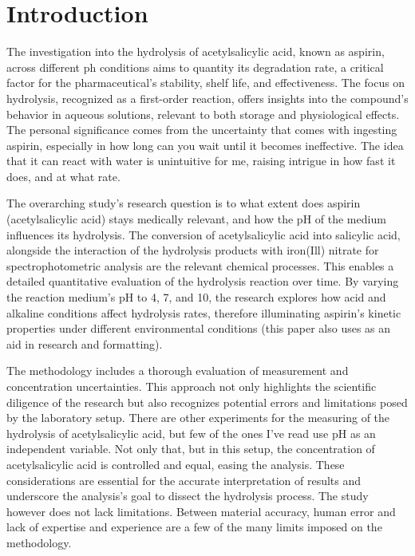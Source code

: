\documentclass{article}
\begin{document}
\pagestyle{fancy}
\fancyhead[R]{}
\fancyhead[L]{}
\renewcommand{\headrulewidth}{0.4pt}
\renewcommand{\footrulewidth}{2pt}

\section{Introduction}
The investigation into the hydrolysis of acetylsalicylic acid, known as aspirin, across different ph conditions aims to quantity its degradation rate, a critical factor for the pharmaceutical's stability, shelf life, and effectiveness. The focus on hydrolysis, recognized as a first-order reaction, offers insights into the compound's behavior in aqueous solutions, relevant to both storage and physiological effects. The personal significance comes from the uncertainty that comes with ingesting aspirin, especially in how long can you wait until it becomes ineffective. The idea that it can react with water is unintuitive for me, raising intrigue in how fast it does, and at what rate.

The overarching study's research question is to what extent does aspirin (acetylsalicylic acid) stays medically relevant, and how the pH of the medium influences its hydrolysis. The conversion of acetylsalicylic acid into salicylic acid, alongside the interaction of the hydrolysis products with iron(Ill) nitrate for spectrophotometric analysis are the relevant chemical processes. This enables a detailed quantitative evaluation of the hydrolysis reaction over time. By varying the reaction medium's pH to 4, 7, and 10, the research explores how acid and alkaline conditions affect hydrolysis rates, therefore illuminating aspirin's kinetic properties under different environmental conditions (this paper also uses \cite{ChatGPT2023} as an aid in research and formatting).

The methodology includes a thorough evaluation of measurement and concentration uncertainties. This approach not only highlights the scientific diligence of the research but also recognizes potential errors and limitations posed by the laboratory setup. There are other experiments for the measuring of the hydrolysis of acetylsalicylic acid, but few of the ones I've read use pH as an independent variable. Not only that, but in this setup, the concentration of acetylsalicylic acid is controlled and equal, easing the analysis. These considerations are essential for the accurate interpretation of results and underscore the analysis's goal to dissect the hydrolysis process. The study however does not lack limitations. Between material accuracy, human error and lack of expertise and experience are a few of the many limits imposed on the methodology.
\end{document}
